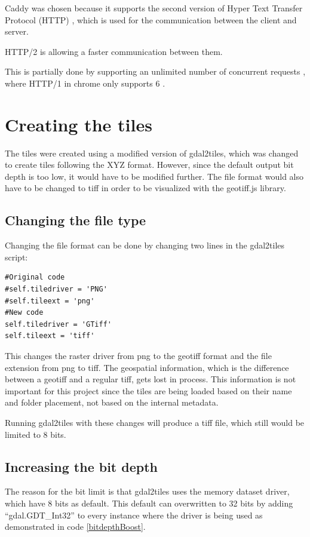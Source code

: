 Caddy was chosen because it supports the second version of Hyper Text Transfer Protocol (HTTP)
\citep{WhyCaddy}, which is used for the communication between the client and server.
\citep{WhatIsHTTP}

HTTP/2 is allowing a faster communication between them.

\citep{HTTP2}
This is partially done by supporting an unlimited number of concurrent requests \citep{DomainSharding}, where HTTP/1 in chrome only supports 6 \citep{OnlySix}.



\section{Creating the tiles}\label{MakeTiles}
The tiles were created using a modified version of gdal2tiles, which was changed to create tiles following the XYZ format. However, since the default output bit depth is too low, it would have to be modified further. The file format would also have to be changed to tiff in order to be visualized with the geotiff.js library. 

\subsection{Changing the file type}
Changing the file format can be done by changing two lines in the gdal2tiles script:

\begin{lstlisting}[language=iPython, caption={Changing the file format}, label= VoresPY,escapechar=|]
#Original code
#self.tiledriver = 'PNG'
#self.tileext = 'png'
#New code
self.tiledriver = 'GTiff'
self.tileext = 'tiff'
\end{lstlisting}
This changes the raster driver from png to the geotiff format and the file extension from png to tiff. 
\citep{RasterDrivers}
The geospatial information, which is the difference between a geotiff and a regular tiff, gets lost in process. This information is not important for this project since the tiles are being loaded based on their name and folder placement, not based on the internal metadata.

Running gdal2tiles with these changes will produce a tiff file, which still would be limited to 8 bits. 
\subsection{Increasing the bit depth}\label{IncreasingBitDepth}
The reason for the bit limit is that gdal2tiles uses the memory dataset driver, which have 8 bits as default.  This default can overwritten to 32 bits by adding “gdal.GDT\_Int32” to every instance where the driver is being used as demonstrated in code \ref{bitdepthBoost}. 
\citep{MoreThan8}

